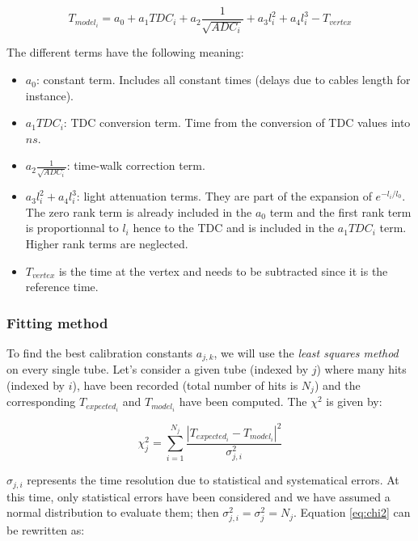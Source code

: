 \documentclass [12pt,letterpaper]{article}
\begin{document}
\begin{equation}
T_{model_{i}} = a_{0} + a_{1}TDC_{i} + a_{2}\frac{1}{\sqrt{ADC_{i}}} +a_{3}l_{i}^{2} + a_{4}l_{i}^{3} - T_{vertex}
\end{equation}

The different terms have the following meaning:

\begin{itemize}
\item $ a_{0} $: constant term. Includes all constant times (delays due to cables length for instance).
\item $ a_{1} TDC_{i} $: TDC conversion term. Time from the conversion of TDC values into $ ns $.
\item $ a_{2} \frac{1}{\sqrt{ADC_{i}} }$: time-walk correction term.
\item $ a_{3}l_{i}^{2} + a_{4}l_{i}^{3} $: light attenuation terms. They are part of the expansion of $e^{-l_{i}/l_{0}}$. The zero rank term is already included in the $a _{0}$ term and the first rank term is proportionnal to $l_{i}$ hence to the TDC and is included in the $ a_{1} TDC_{i}$ term. Higher rank terms are neglected.
\item $ T_{vertex} $ is the time at the vertex and needs to be subtracted since it is the reference time. 
\end{itemize}

\subsubsection{Fitting method}

To find the best calibration constants  $a_{j, k}$, we will use the {\it least squares method} on every single tube. Let's consider a given tube (indexed by $j$) where many hits (indexed by $i$), have been recorded (total number of hits is $N_{j}$) and the corresponding $T_{expected_{i}}$ and $T_{model_{i}}$ have been computed. The $\chi^2$ is given by:

\begin{equation}
\chi ^{2}_{j} = \sum_{i = 1}^{N_{j}} \frac{\left| T _{expected_{i}} - T _{model_{i}} \right| ^{2} }{ \sigma_{j,i} ^{2} } \label{eq:chi2}
\end{equation}

$ \sigma_{j, i} $ represents the time resolution due to statistical and systematical errors. At this time, only statistical errors have been considered and we have assumed a normal distribution to evaluate them; then $ \sigma_{j, i}^{2} =  \sigma_{j}^{2} = N_{j} $. Equation \ref{eq:chi2} can be rewritten as:
\end{document}
